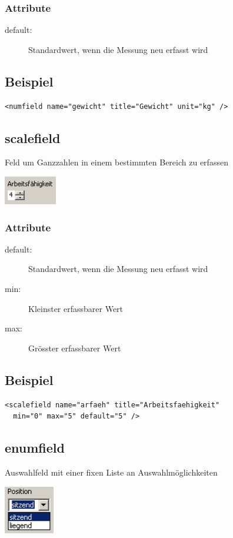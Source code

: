 \documentclass[a4paper]{scrartcl}
\begin{document}
\subsubsection{Attribute}
\begin{description}
    \item [default:] Standardwert, wenn die Messung neu erfasst wird
\end{description}
\subsection{Beispiel}
\begin{lstlisting}
<numfield name="gewicht" title="Gewicht" unit="kg" />
\end{lstlisting}

\subsection{scalefield}
Feld um Ganzzahlen in einem bestimmten Bereich zu erfassen
\begin{center}
    \includegraphics[width=2.3cm]{images/scalefield.png}
\end{center}
\subsubsection{Attribute}
\begin{description}
    \item[default:]  Standardwert, wenn die Messung neu erfasst wird
    \item[min:] Kleinster erfassbarer Wert
    \item[max:] Grösster erfassbarer Wert
\end{description}
\subsection{Beispiel}
\begin{lstlisting}
<scalefield name="arfaeh" title="Arbeitsfaehigkeit"
  min="0" max="5" default="5" />
\end{lstlisting}

\subsection{enumfield}
Auswahlfeld mit einer fixen Liste an Auswahlmöglichkeiten
\begin{center}
    \includegraphics[width=2.2cm]{images/enumfield.png}
\end{center}
\end{document}

